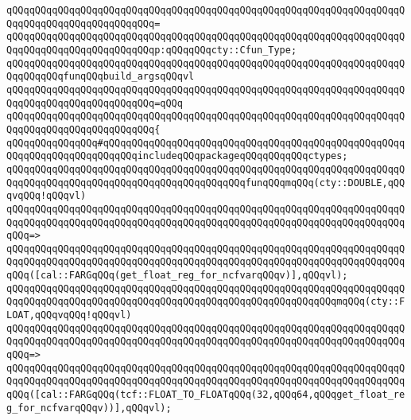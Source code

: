 \verb|qQQqqQQqqQQqqQQqqQQqqQQqqQQqqQQqqQQqqQQqqQQqqQQqqQQqqQQqqQQqqQQqqQQqqQQqqQQqqQQqqQQqqQQqqQQqqQQq=|\newline
\verb|qQQqqQQqqQQqqQQqqQQqqQQqqQQqqQQqqQQqqQQqqQQqqQQqqQQqqQQqqQQqqQQqqQQqqQQqqQQqqQQqqQQqqQQqqQQqqQQqp:qQQqqQQqcty::Cfun_Type;|\newline
\newline
\newline
\verb|qQQqqQQqqQQqqQQqqQQqqQQqqQQqqQQqqQQqqQQqqQQqqQQqqQQqqQQqqQQqqQQqqQQqqQQqqQQqqQQqfunqQQqbuild_argsqQQqvl|\newline
\verb|qQQqqQQqqQQqqQQqqQQqqQQqqQQqqQQqqQQqqQQqqQQqqQQqqQQqqQQqqQQqqQQqqQQqqQQqqQQqqQQqqQQqqQQqqQQqqQQq=qQQq|\newline
\verb|qQQqqQQqqQQqqQQqqQQqqQQqqQQqqQQqqQQqqQQqqQQqqQQqqQQqqQQqqQQqqQQqqQQqqQQqqQQqqQQqqQQqqQQqqQQqqQQq{|\newline
\verb|qQQqqQQqqQQqqQQq#qQQqqQQqqQQqqQQqqQQqqQQqqQQqqQQqqQQqqQQqqQQqqQQqqQQqqQQqqQQqqQQqqQQqqQQqqQQqincludeqQQqpackageqQQqqQQqqQQqctypes;|\newline
\newline
\verb|qQQqqQQqqQQqqQQqqQQqqQQqqQQqqQQqqQQqqQQqqQQqqQQqqQQqqQQqqQQqqQQqqQQqqQQqqQQqqQQqqQQqqQQqqQQqqQQqqQQqqQQqqQQqqQQqfunqQQqmqQQq(cty::DOUBLE,qQQqvqQQq!qQQqvl)|\newline
\verb|qQQqqQQqqQQqqQQqqQQqqQQqqQQqqQQqqQQqqQQqqQQqqQQqqQQqqQQqqQQqqQQqqQQqqQQqqQQqqQQqqQQqqQQqqQQqqQQqqQQqqQQqqQQqqQQqqQQqqQQqqQQqqQQqqQQqqQQqqQQqqQQq=>|\newline
\verb|qQQqqQQqqQQqqQQqqQQqqQQqqQQqqQQqqQQqqQQqqQQqqQQqqQQqqQQqqQQqqQQqqQQqqQQqqQQqqQQqqQQqqQQqqQQqqQQqqQQqqQQqqQQqqQQqqQQqqQQqqQQqqQQqqQQqqQQqqQQqqQQq([cal::FARGqQQq(get_float_reg_for_ncfvarqQQqv)],qQQqvl);|\newline
\newline
\verb|qQQqqQQqqQQqqQQqqQQqqQQqqQQqqQQqqQQqqQQqqQQqqQQqqQQqqQQqqQQqqQQqqQQqqQQqqQQqqQQqqQQqqQQqqQQqqQQqqQQqqQQqqQQqqQQqqQQqqQQqqQQqqQQqmqQQq(cty::FLOAT,qQQqvqQQq!qQQqvl)|\newline
\verb|qQQqqQQqqQQqqQQqqQQqqQQqqQQqqQQqqQQqqQQqqQQqqQQqqQQqqQQqqQQqqQQqqQQqqQQqqQQqqQQqqQQqqQQqqQQqqQQqqQQqqQQqqQQqqQQqqQQqqQQqqQQqqQQqqQQqqQQqqQQqqQQq=>|\newline
\verb|qQQqqQQqqQQqqQQqqQQqqQQqqQQqqQQqqQQqqQQqqQQqqQQqqQQqqQQqqQQqqQQqqQQqqQQqqQQqqQQqqQQqqQQqqQQqqQQqqQQqqQQqqQQqqQQqqQQqqQQqqQQqqQQqqQQqqQQqqQQqqQQq([cal::FARGqQQq(tcf::FLOAT_TO_FLOATqQQq(32,qQQq64,qQQqget_float_reg_for_ncfvarqQQqv))],qQQqvl);|\newline
\newline
